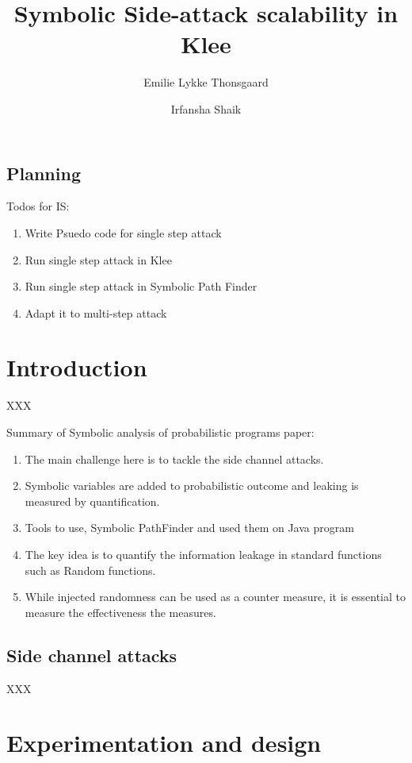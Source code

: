 \documentclass[11pt]{report}
\title{Symbolic Side-attack scalability in Klee}
\author{Emilie Lykke Thonsgaard \and Irfansha Shaik}
\begin{document}
\maketitle

\section{Planning}
\label{sec:planning}

Todos for IS:
\begin{enumerate}
\item Write Psuedo code for single step attack
\item Run single step attack in Klee
\item Run single step attack in Symbolic Path Finder
\item Adapt it to multi-step attack
\end{enumerate}

\chapter{Introduction}
\label{cha:introduction}

XXX

Summary of Symbolic analysis of probabilistic programs paper:
\begin{enumerate}
\item The main challenge here is to tackle the side channel attacks.
\item Symbolic variables are added to probabilistic outcome and leaking is measured by quantification.
\item Tools to use, Symbolic PathFinder and used them on Java program
\item The key idea is to quantify the information leakage in standard functions such as Random functions.
\item While injected randomness can be used as a counter measure, it is essential to measure the effectiveness the measures.
\end{enumerate}

\section{Side channel attacks}
\label{sec:sidechannelattacks}

XXX

\chapter{Experimentation and design}
\label{cha:experimentationanddesign}
\end{document}
